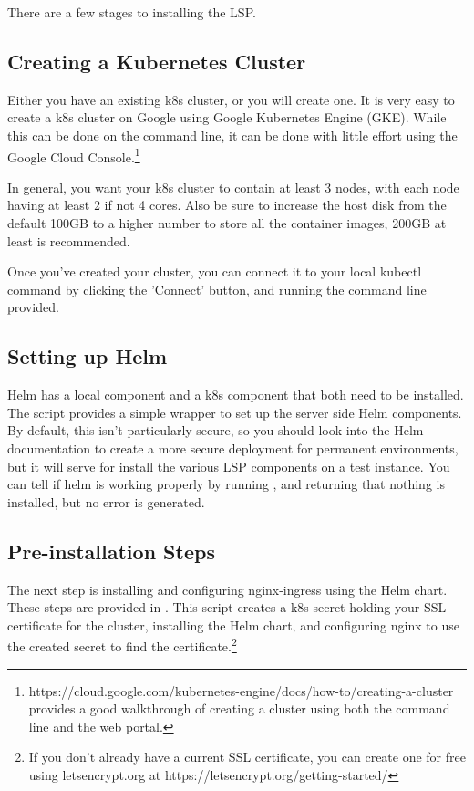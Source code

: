 \documentclass[11pt,twoside]{article}
\begin{document}
There are a few stages to installing the LSP.

\subsection{Creating a Kubernetes Cluster}

Either you have an existing k8s cluster, or you will create one.  It is very
easy to create a k8s cluster on Google using Google Kubernetes Engine (GKE).
While this can be done on the command line, it can be done with little effort
using the Google Cloud Console.\footnote{https://cloud.google.com/kubernetes-engine/docs/how-to/creating-a-cluster
provides a good walkthrough of creating a cluster using both the command line
and the web portal.}

In general, you want your k8s cluster to contain at least 3 nodes, with each node
having at least 2 if not 4 cores.  Also be sure to increase the host disk from
the default 100GB to a higher number to store all the container images,
200GB at least is recommended.

Once you've created your cluster, you can connect it to your local kubectl
command by clicking the 'Connect' button, and running the command line provided.

\subsection{Setting up Helm}

Helm has a local component and a k8s component that both need to be installed.
The  script provides a simple wrapper to set up the
server side Helm components.
By default, this isn't particularly secure, so you should look into the Helm
documentation to create a more secure deployment for permanent environments,
but it will serve for install the various LSP components on a test instance.
You can tell if helm is working properly by running , and returning that nothing
is installed, but no error is generated.

\subsection{Pre-installation Steps}

The next step is installing and configuring nginx-ingress using the Helm chart.
These steps are provided in .  This script creates
a k8s secret holding your SSL certificate for the cluster, installing the Helm
chart, and configuring nginx to use the created secret to find the certificate.\footnote{
If you don't already have a current SSL certificate, you can create one for
free using letsencrypt.org at https://letsencrypt.org/getting-started/}
\end{document}
